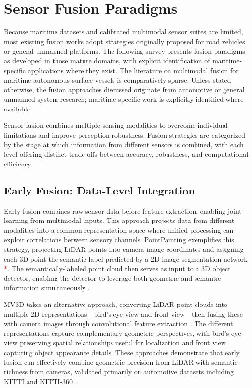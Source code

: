 \documentclass[../main.tex]{subfiles}
\begin{document}
\section{Sensor Fusion Paradigms}

Because maritime datasets and calibrated multimodal sensor suites are limited, most existing fusion works adopt strategies originally proposed for road vehicles or general unmanned platforms. The following survey presents fusion paradigms as developed in those mature domains, with explicit identification of maritime-specific applications where they exist. The literature on multimodal fusion for maritime autonomous surface vessels is comparatively sparse. Unless stated otherwise, the fusion approaches discussed originate from automotive or general unmanned system research; maritime-specific work is explicitly identified where available.

Sensor fusion combines multiple sensing modalities to overcome individual limitations and improve perception robustness. Fusion strategies are categorized by the stage at which information from different sensors is combined, with each level offering distinct trade-offs between accuracy, robustness, and computational efficiency.

\subsection{Early Fusion: Data-Level Integration}

Early fusion combines raw sensor data before feature extraction, enabling joint learning from multimodal inputs. This approach projects data from different modalities into a common representation space where unified processing can exploit correlations between sensory channels. PointPainting exemplifies this strategy, projecting LiDAR points into camera image coordinates and assigning each 3D point the semantic label predicted by a 2D image segmentation network \textcolor{red}{*}. The semantically-labeled point cloud then serves as input to a 3D object detector, enabling the detector to leverage both geometric and semantic information simultaneously \cite{cui2022}.

MV3D takes an alternative approach, converting LiDAR point clouds into multiple 2D representations—bird's-eye view and front view—then fusing these with camera images through convolutional feature extraction \cite{chen2017}. The different representations capture complementary geometric perspectives, with bird's-eye view preserving spatial relationships useful for localization and front view capturing object appearance details. These approaches demonstrate that early fusion can effectively combine geometric precision from LiDAR with semantic richness from cameras, validated primarily on automotive datasets including KITTI and KITTI-360 \cite{geiger2012}.
\end{document}
